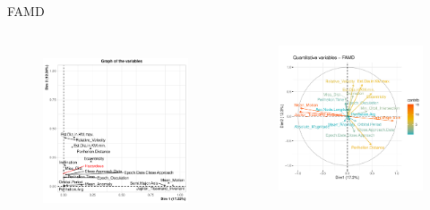 \documentclass{beamer}
\begin{document}
\begin{frame}{FAMD}
\begin{columns}  

    \begin{figure}[h]
\begin{center}
\includegraphics[width=1\textwidth]{Pic/FAMD.pdf}
\label{FADM}
\end{center}
\end{figure}
 \begin{figure}[h]
\begin{center}
\includegraphics[width=1\textwidth]{Pic/FAMD_Quantitative variables.pdf}

\end{center}
\end{figure}
\end{columns}
\end{frame}
\end{document}
